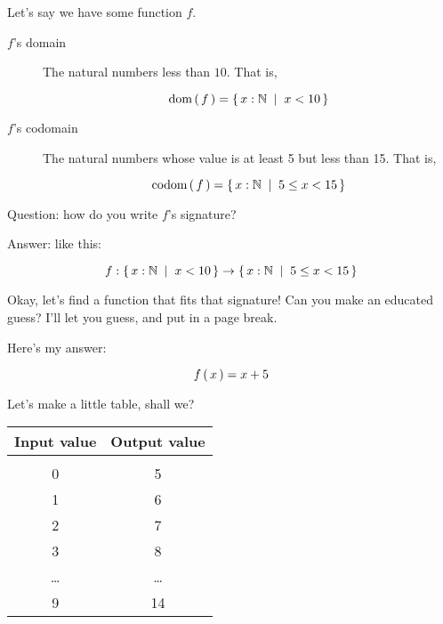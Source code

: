 \begin{example}
    Let's say we have some function $f$.

    \begin{description}
      \item[$f$'s domain] The natural numbers less than $10$. That is,

        \begin{equation}
            \text{dom} \left(\, f \,\right) = \left\{\, x : \mathbb{N}\; \mid \; x < 10 \,\right\}
        \end{equation}

      \item[$f$'s codomain] The natural numbers whose value is at least 5 but
        less than 15. That is,

        \begin{equation}
            \text{codom} \left(\, f \,\right) = \left\{\, x : \mathbb{N}\; \mid \; 5 \leq x < 15 \,\right\}
        \end{equation}
    \end{description}

    Question: how do you write $f$'s signature?

    Answer: like this:

    \begin{equation}
        f : \left\{\, x : \mathbb{N}\; \mid \; x < 10 \,\right\} \to \left\{\, x : \mathbb{N}\; \mid \; 5 \leq x < 15 \,\right\}
    \end{equation}

    Okay, let's find a function that fits that signature! Can you make an
    educated guess? I'll let you guess, and put in a page break.

    \newpage

    Here's my answer:

    \begin{equation}
        f \left(\, x \,\right) = x + 5
    \end{equation}

    Let's make a little table, shall we?

    \begin{tabu}{c|c}
      Input value & Output value \\
      \hline \\
      0 & 5 \\
      1 & 6 \\
      2 & 7 \\
      3 & 8 \\
      \dots & \dots \\
      9 & 14 \\
    \end{tabu}


\end{example}
